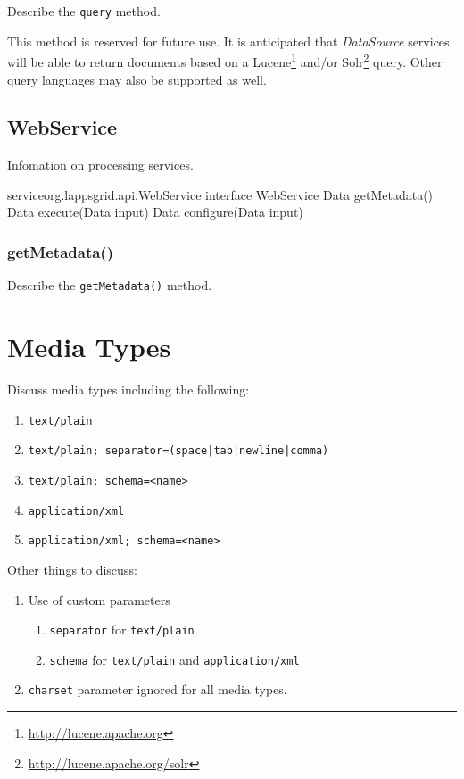 \documentclass{article}
\newcommand{\source}{\emph{DataSource}\xspace}
\renewcommand{\tt}[1]{\texttt{#1}}
\newenvironment{enum}{
\begin{enumerate}
  \setlength{\itemsep}{1pt}
  \setlength{\parskip}{0pt}
  \setlength{\parsep}{0pt}
}{\end{enumerate}}
\begin{document}
Describe the \tt{query} method.

This method is reserved for future use.  It is anticipated that \source services will be able to return documents based on a Lucene\footnote{\url{http://lucene.apache.org}} and/or Solr\footnote{\url{http://lucene.apache.org/solr}} query.  Other query languages may also be supported as well.


\subsection{WebService}\label{sub:WebService}

Infomation on processing services.

\begin{groovy}{service}{org.lappsgrid.api.WebService}
	interface WebService {
		Data getMetadata()
		Data execute(Data input)
		Data configure(Data input)
	}
\end{groovy}

\subsubsection{getMetadata()}

Describe the \tt{getMetadata()} method.


\section{Media Types}\label{sec:media}

Discuss media types including the following:
\begin{enum}
	\item \tt{text/plain}
	\item \tt{text/plain; separator=(space|tab|newline|comma)}
	\item \tt{text/plain; schema=<name>}
	\item \tt{application/xml}
	\item \tt{application/xml; schema=<name>}
\end{enum}

Other things to discuss:
\begin{enum}
	\item Use of custom parameters
	\begin{enum}
		\item \tt{separator} for \tt{text/plain}
		\item \tt{schema} for \tt{text/plain} and \tt{application/xml}
	\end{enum}
	\item \tt{charset} parameter ignored for all media types.
\end{enum}
\end{document}
